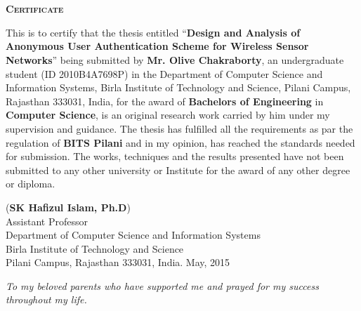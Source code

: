\documentclass[a4paper,12pt]{report}
\newenvironment{dedication}
  {\clearpage           %
   \thispagestyle{empty}%
   \vspace*{\stretch{1}}%
   \itshape             %
   \centering          %
  }
  {\par %
   \vspace{\stretch{3}} %
   \clearpage           %
  }
\begin{document}
\chapter*{}
\setcounter{page}{1} 
\begin{center}
\textbf{\textsc{\Large Certificate}}\\[0.75cm]
\end{center}
\onehalfspacing This is to certify that the thesis entitled
``\textbf{Design and Analysis of Anonymous User Authentication
Scheme for Wireless Sensor Networks}'' being submitted by
\textbf{Mr. Olive Chakraborty}, an undergraduate student (ID
2010B4A7698P) in the Department of Computer Science and Information
Systems, Birla Institute of Technology and Science, Pilani Campus,
Rajasthan 333031, India, for the award of \textbf{Bachelors of
Engineering} in \textbf{Computer Science}, is an original research
work carried by him under my supervision and guidance. The thesis
has fulfilled all the requirements as par the regulation of
\textbf{BITS Pilani} and in my opinion, has reached the standards
needed for submission. The works, techniques and the results
presented have not been submitted to any other university or
Institute for the award of any other
degree or diploma.\\
\bigskip
\bigskip
\bigskip
\bigskip
\bigskip
\bigskip
\bigskip
\begin{flushleft}
\bigskip
(\textbf{SK Hafizul Islam, Ph.D})\\
\smallskip
Assistant Professor\\
Department of Computer Science and Information Systems\\
Birla Institute of Technology and Science\\
Pilani Campus, Rajasthan 333031, India.
May, 2015\\
\end{flushleft}

\newpage
\begin{dedication}
\textit{To my beloved parents who have supported me and prayed for
my success\\ throughout my life.}
\end{dedication}
\end{document}
